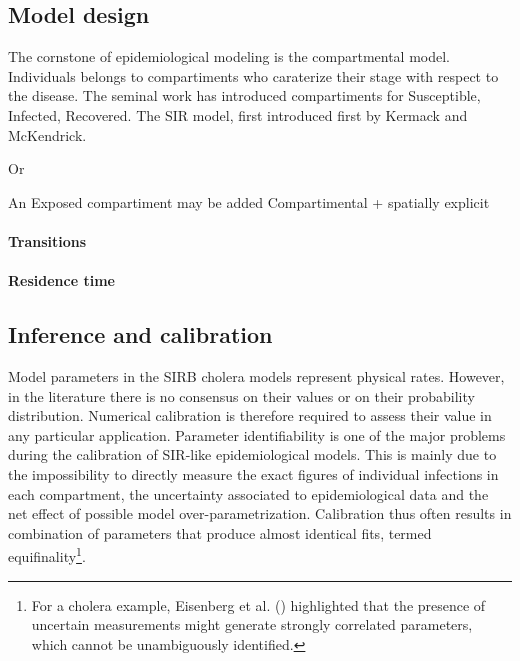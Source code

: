 \subsection{Model design}


The cornstone of epidemiological modeling is the compartmental model. Individuals belongs to compartiments who caraterize their stage with respect to the disease. The seminal work has introduced compartiments for Susceptible, Infected, Recovered. The SIR model, first introduced first by Kermack and McKendrick\cite{Kermack:ContributionMathematicalTheory:1927}. 

Or

An Exposed compartiment may be added 
Compartimental + spatially explicit

\paragraph{Transitions}



\paragraph{Residence time}

\cite{Hurtado:GeneralizationsLinearChain:2019}


\subsection{Inference and calibration} 
Model parameters in the SIRB cholera models represent physical rates. However, in the literature there is no consensus on their values or on their  probability distribution. Numerical calibration is therefore required to assess their value in any particular application. Parameter identifiability is one of the major problems during the calibration of SIR-like epidemiological models. This is mainly due to the impossibility to directly measure the exact figures of individual infections in each compartment, the uncertainty associated to epidemiological data and the net effect of possible model over-parametrization. Calibration thus often results in combination of parameters that produce almost identical fits, termed equifinality\footnote{For a cholera example, Eisenberg et al. () highlighted that the presence of uncertain measurements might generate strongly correlated parameters, which cannot be unambiguously identified.}.


